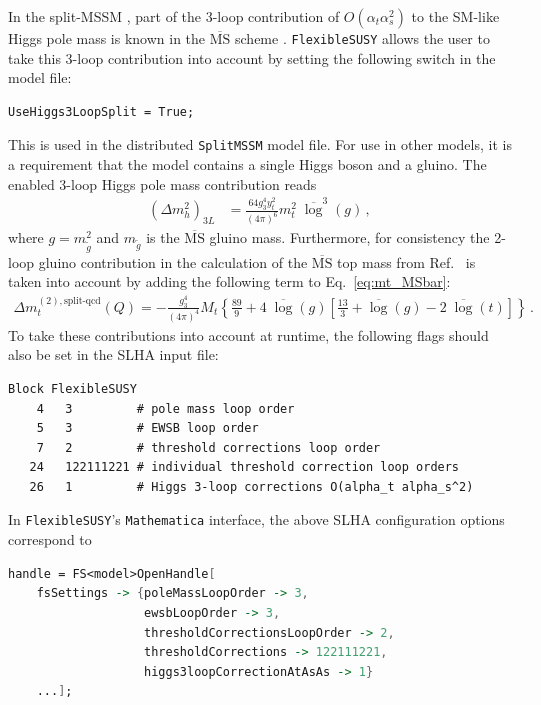 \documentclass[final,3p,11pt,pdflatex]{elsarticle}
\makeatletter
\newcommand{\modelname}[1]{\texttt{#1}\@\xspace}
\newcommand{\fs}{\texttt{FlexibleSUSY}\@\xspace}
\newcommand{\mathematica}{\texttt{Ma\-the\-ma\-ti\-ca}\xspace}
\newcommand{\ol}[1]{\overline{#1}}
\newcommand{\MSbar}{\ensuremath{\ol{\text{MS}}}\xspace}
\newcommand{\barlog}{\overline{\log}}
\def\at{\alpha_t}
\def\as{\alpha_s}
\makeatother
\begin{document}
In the split-MSSM \cite{Bagnaschi:2014rsa}, part of the 3-loop
contribution of $O(\at \as^2)$
to the SM-like Higgs pole mass is known in the \MSbar
scheme \cite{Benakli:2013msa}.  \fs allows the user to take this
3-loop contribution into account by setting the following switch in
the model file:
%
\begin{lstlisting}
UseHiggs3LoopSplit = True;
\end{lstlisting}
%
This is used in the distributed \modelname{SplitMSSM} model file. For use in
other models, it is a requirement that the model contains a single
Higgs boson and a gluino.  The enabled 3-loop Higgs pole mass
contribution reads
%
\begin{align}
  (\Delta m_h^2)_{3L} &= \frac{64 g_3^4 y_t^2}{(4\pi)^6} m_t^2\;\barlog^3(g) \,,
\end{align}
%
where $g = m_{\tilde{g}}^2$ and $m_{\tilde{g}}$ is the \MSbar gluino
mass.  Furthermore, for consistency the 2-loop gluino contribution in
the calculation of the \MSbar top mass from Ref.\
\cite{Benakli:2013msa} is taken into account by adding the following
term to Eq.\ \eqref{eq:mt_MSbar}:
%
\begin{align}
  \Delta m_t^{(2),\text{split-qcd}}(Q) =
  -\frac{g_3^4}{(4\pi)^4} M_t \left\{
     \frac{89}{9}
     + 4\;\barlog(g) \left[
        \frac{13}{3}
        + \barlog(g)
        - 2\;\barlog(t)
     \right]
  \right\} \,.
\end{align}
%
To take these contributions into account at runtime, the following flags
should also be set in the SLHA input file:
%
\begin{lstlisting}
Block FlexibleSUSY
    4   3         # pole mass loop order
    5   3         # EWSB loop order
    7   2         # threshold corrections loop order
   24   122111221 # individual threshold correction loop orders
   26   1         # Higgs 3-loop corrections O(alpha_t alpha_s^2)
\end{lstlisting}
%
In \fs's \mathematica interface, the above SLHA configuration options
correspond to
%
\\\begin{minipage}{\linewidth}
\begin{lstlisting}[language=Mathematica]
handle = FS<model>OpenHandle[
    fsSettings -> {poleMassLoopOrder -> 3,
                   ewsbLoopOrder -> 3,
                   thresholdCorrectionsLoopOrder -> 2,
                   thresholdCorrections -> 122111221,
                   higgs3loopCorrectionAtAsAs -> 1}
    ...];
\end{lstlisting}
\end{minipage}
\end{document}
